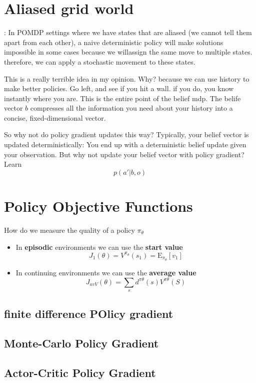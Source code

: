 \documentclass[11pt]{article}
\begin{document}
\section{Aliased grid world}:
In POMDP settings where we have states that are aliased (we cannot tell them apart from each other), a naive deterministic
policy will make solutions impossible in some cases because we willassign the same move to multiple states. therefore,
we can apply a stochastic movement to these states.

This is a really terrible idea in my opinion. Why? because we can use history to make better policies. Go left, and see if
you hit a wall. if you do, you know instantly where you are. This is the entire point of the belief mdp. The belife vector
$b$ compresses all the information you need about your history into a concise, fixed-dimensional vector.

So why not do policy gradient updates this way? Typically, your belief vector is updated deterministically: You end up with
a deterministic belief update given your observation. But why not update your belief vector with policy gradient? Learn
\[p(a'|b, o) \]



\section{Policy Objective Functions}
How do we measure the quality of a policy $\pi_\theta$
\begin{itemize}
\item In \textbf{episodic} environments we can use the \textbf{start value}
  \[ J_1(\theta) = V^{\pi_\theta}(s_1)=\textrm{E}_{\pi_\theta}[v_1]\]
\item In continuing environments we can use the \textbf{average value}
  \[J_{avV}(\theta) = \sum_sd^{\pi\theta}(s)V^{\pi\theta}(S) \]
\end{itemize}

\subsection{finite difference POlicy gradient}

\subsection{Monte-Carlo Policy Gradient}

\subsection{Actor-Critic Policy Gradient}
\end{document}
